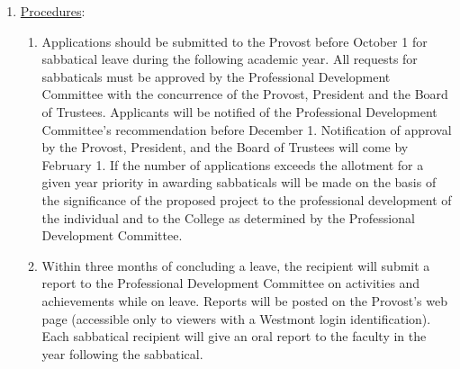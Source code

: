 \begin{enumerate}[label=\alph*)]
{\begin{enumerate}[label=\arabic*)]
						\end{enumerate}
					}
					\item{\underline{Procedures}:
						\begin{enumerate}[label=\arabic*)]
							\item{Applications should be submitted to the Provost before October 1 for sabbatical leave during the following academic year.  All requests for sabbaticals must be approved by the Professional Development Committee with the concurrence of the Provost, President and the Board of Trustees.  Applicants will be notified of the Professional Development Committee's recommendation before December 1.  Notification of approval by the Provost, President, and the Board of Trustees will come by February 1. If the number of applications exceeds the allotment for a given year priority in awarding sabbaticals will be made on the basis of the significance of the proposed project to the professional development of the individual and to the College as determined by the Professional Development Committee.}
							\item{Within three months of concluding a leave, the recipient will submit a report to the Professional Development Committee on activities and achievements while on leave.  Reports will be posted on the Provost's web page (accessible only to viewers with a Westmont login identification).  Each sabbatical recipient will give an oral report to the faculty in the year following the sabbatical.}
						\end{enumerate}
					}
				\end{enumerate}
